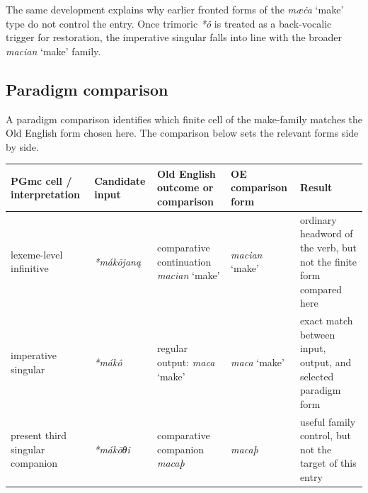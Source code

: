 \documentclass[
  british,
  a4paper,
  openany]{book}
\newcounter{none} %
\begin{document}
The same development explains why earlier fronted forms of the
\emph{mæċa} `make' type do not control the entry. Once trimoric
\emph{*ô} is treated as a back-vocalic trigger for restoration, the
imperative singular falls into line with the broader \emph{macian}
`make' family.

\subsection{Paradigm comparison}\label{paradigm-comparison-18}

A paradigm comparison identifies which finite cell of the make-family
matches the Old English form chosen here. The comparison below sets the
relevant forms side by side.

{\def\LTcaptype{none} %
\begin{longtable}[]{@{}
  >{\raggedright\arraybackslash}p{}
  >{\raggedright\arraybackslash}p{}
  >{\raggedright\arraybackslash}p{}
  >{\raggedright\arraybackslash}p{}
  >{\raggedright\arraybackslash}p{}@{}}
\toprule\noalign{}
\begin{minipage}[b]{\linewidth}\raggedright
PGmc cell / interpretation
\end{minipage} & \begin{minipage}[b]{\linewidth}\raggedright
Candidate input
\end{minipage} & \begin{minipage}[b]{\linewidth}\raggedright
Old English outcome or comparison
\end{minipage} & \begin{minipage}[b]{\linewidth}\raggedright
OE comparison form
\end{minipage} & \begin{minipage}[b]{\linewidth}\raggedright
Result
\end{minipage} \\
\midrule\noalign{}
\endhead
\bottomrule\noalign{}
\endlastfoot
lexeme-level infinitive & {\emph{*mákōjaną}} & comparative continuation
{\emph{macian}} `make' & {\emph{macian}} `make' & ordinary headword of
the verb, but not the finite form compared here \\
imperative singular & {\emph{*mákô}} & regular output: {\emph{maca}}
`make' & {\emph{maca}} `make' & exact match between input, output, and
selected paradigm form \\
present third singular companion & {\emph{*mákōθi}} & comparative
companion {\emph{macaþ}} & {\emph{macaþ}} & useful family control, but
not the target of this entry \\
\end{longtable}
}
\end{document}
